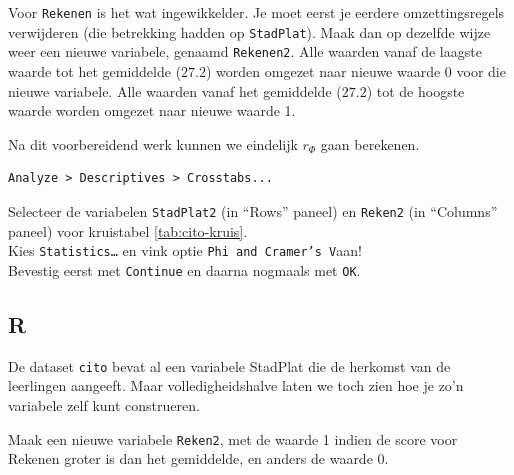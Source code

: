 \documentclass[
]{book}
\newenvironment{Shaded}{\begin{snugshade}}{\end{snugshade}}
\newcommand{\CommentTok}[1]{\textcolor[rgb]{0.56,0.35,0.01}{\textit{#1}}}
\newcommand{\DecValTok}[1]{\textcolor[rgb]{0.00,0.00,0.81}{#1}}
\newcommand{\KeywordTok}[1]{\textcolor[rgb]{0.13,0.29,0.53}{\textbf{#1}}}
\newcommand{\NormalTok}[1]{#1}
\newcommand{\OperatorTok}[1]{\textcolor[rgb]{0.81,0.36,0.00}{\textbf{#1}}}
\newcommand{\StringTok}[1]{\textcolor[rgb]{0.31,0.60,0.02}{#1}}
\begin{document}
Voor \texttt{Rekenen} is het wat ingewikkelder. Je moet eerst je eerdere
omzettingsregels verwijderen (die betrekking hadden op \texttt{StadPlat}). Maak
dan op dezelfde wijze weer een nieuwe variabele, genaamd \texttt{Rekenen2}.
Alle waarden vanaf de laagste waarde tot het gemiddelde (\(27.2\)) worden
omgezet naar nieuwe waarde 0 voor die nieuwe variabele. Alle waarden
vanaf het gemiddelde (\(27.2\)) tot de hoogste waarde worden omgezet naar
nieuwe waarde 1.

Na dit voorbereidend werk kunnen we eindelijk \(r_\Phi\) gaan berekenen.

\begin{verbatim}
Analyze > Descriptives > Crosstabs...
\end{verbatim}

Selecteer de variabelen \texttt{StadPlat2} (in ``Rows'' paneel) en \texttt{Reken2}
(in ``Columns'' paneel) voor
kruistabel \ref{tab:cito-kruis}.\\
Kies \texttt{Statistics\ldots{}} en vink optie \texttt{Phi\ and\ Cramer’s\ V}aan!\\
Bevestig eerst met \texttt{Continue} en daarna nogmaals met \texttt{OK}.

\hypertarget{r-9}{%
\subsection{R}\label{r-9}}

De dataset \texttt{cito} bevat al een variabele StadPlat die de herkomst van de leerlingen aangeeft. Maar volledigheidshalve laten we toch zien hoe je zo'n variabele zelf kunt construeren.

\begin{Shaded}
\end{Shaded}

Maak een nieuwe variabele \texttt{Reken2}, met de waarde 1 indien de score
voor Rekenen groter is dan het gemiddelde, en anders de waarde 0.
\end{document}
